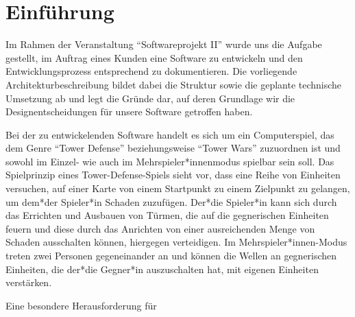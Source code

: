 \documentclass[enabledeprecatedfontcommands,fontsize=12pt,paper=a4,twoside,parskip=half]{scrartcl}
\begin{document}
\clearpage

\section{Einführung}

Im Rahmen der Veranstaltung \enquote{Softwareprojekt II} wurde uns die Aufgabe gestellt, im Auftrag eines Kunden eine Software zu entwickeln und den Entwicklungsprozess entsprechend zu dokumentieren. Die vorliegende Architekturbeschreibung bildet dabei die Struktur sowie die geplante technische Umsetzung ab und legt die Gründe dar, auf deren Grundlage wir die Designentscheidungen für unsere Software getroffen haben.

Bei der zu entwickelenden Software handelt es sich um ein Computerspiel, das dem Genre \enquote{Tower Defense} beziehungsweise \enquote{Tower Wars} zuzuordnen ist und sowohl im Einzel- wie auch im Mehrspieler*innenmodus spielbar sein soll. Das Spielprinzip eines Tower-Defense-Spiels sieht vor, dass eine Reihe von Einheiten versuchen, auf einer Karte von einem Startpunkt zu einem Zielpunkt zu gelangen, um dem*der Spieler*in Schaden zuzufügen. Der*die Spieler*in kann sich durch das Errichten und Ausbauen von Türmen, die auf die gegnerischen Einheiten feuern und diese durch das Anrichten von einer ausreichenden Menge von Schaden ausschalten können, hiergegen verteidigen. Im Mehrspieler*innen-Modus treten zwei Personen gegeneinander an und können die Wellen an gegnerischen Einheiten, die der*die Gegner*in auszuschalten hat, mit eigenen Einheiten verstärken. 

Eine besondere Herausforderung für 


\end{document}
